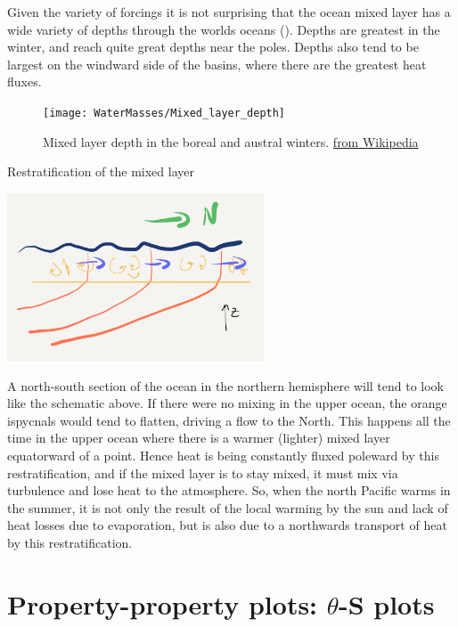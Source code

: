 Given the variety of forcings it is not surprising that the ocean mixed layer has a wide variety of depths through the worlds oceans ().  Depths are greatest in the winter, and reach quite great depths near the poles.  Depths also tend to be largest on the windward side of the basins, where there are the greatest heat fluxes.  

\begin{figure}[htp]
  \centering
  \texttt{[image: WaterMasses/Mixed\_layer\_depth]}
    \caption{Mixed layer depth in the boreal and austral winters. \protect\href{https://en.wikipedia.org/wiki/Mixed_layer#/media/File:Mixed_layer_depth.png}{from Wikipedia}}
    \label{fig:Mixed_layer_depth}  
\end{figure}

\begin{derivbox}[label={box:Restratification}]{Restratification of the mixed layer}
  \begin{center}
    \includegraphics[width=3in]{figs/WaterMasses/SchemRestratfication}
  \end{center}
  A north-south section of the ocean in the northern hemisphere will tend to look like the schematic above.  If there were no mixing in the upper ocean, the orange ispycnals would tend to flatten, driving a flow to the North.  This happens all the time in the upper ocean where there is a warmer (lighter) mixed layer equatorward of a point.  Hence heat is being constantly fluxed poleward by this restratification, and if the mixed layer is to stay mixed, it must mix via turbulence and lose heat to the atmosphere.  So, when the north Pacific warms in the summer, it is not only the result of the local warming by the sun and lack of heat losses due to evaporation, but is also due to a northwards transport of heat by this restratification.  
\end{derivbox}

\section{Property-property plots: $\theta$-S plots}

